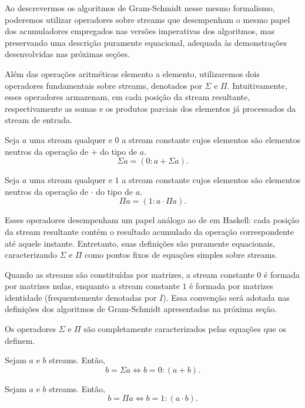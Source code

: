 Ao descrevermos os algoritmos de Gram-Schmidt nesse mesmo formalismo, poderemos utilizar operadores sobre streams que desempenham o mesmo papel dos acumuladores empregados nas versões imperativas dos algoritmos, mas preservando uma descrição puramente equacional, adequada às demonstrações desenvolvidas nas próximas seções.

Além das operações aritméticas elemento a elemento, utilizaremos dois operadores fundamentais sobre streams, denotados por $\Sigma$ e $\Pi$. Intuitivamente, esses operadores armazenam, em cada posição da stream resultante, respectivamente as somas e os produtos parciais dos elementos já processados da stream de entrada.

\begin{definition}\label{def: Sigma}
  Seja $a$ uma stream qualquer e $0$ a stream constante cujos elementos são elementos neutros da operação de $+$ do tipo de $a$.
  \[\Sigma a = (0 : a + \Sigma a).\]
\end{definition}

\begin{definition}\label{def: Pi}
  Seja $a$ uma stream qualquer e $1$ a stream constante cujos elementos são elementos neutros da operação de $\cdot$ do tipo de $a$.
  \[\Pi a = (1 : a \cdot \Pi a).\]
\end{definition}

Esses operadores desempenham um papel análogo ao de  em Haskell: cada posição da stream resultante contém o resultado acumulado da operação correspondente até aquele instante. Entretanto, suas definições são puramente equacionais, caracterizando $\Sigma$ e $\Pi$ como pontos fixos de equações simples sobre streams.

Quando as streams são constituídas por matrizes, a stream constante $0$ é formada por matrizes nulas, enquanto a stream constante $1$ é formada por matrizes identidade (frequentemente denotadas por $I$). Essa convenção será adotada nas definições dos algoritmos de Gram-Schmidt apresentadas na próxima seção.

Os operadores $\Sigma$ e $\Pi$ são completamente caracterizados pelas equações que os definem.

\begin{lemma}\label{lemma: Sigma-universal-prop}
Sejam $a$ e $b$ streams. Então,
\[
  b = \Sigma a
  \iff
  b = 0 : (a + b).
\]
\end{lemma}

\begin{lemma}\label{lemma: Pi-universal-prop}
Sejam $a$ e $b$ streams. Então,
\[
  b = \Pi a
  \iff
  b = 1 : (a \cdot b).
\]
\end{lemma}

